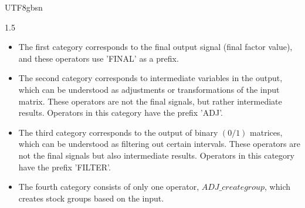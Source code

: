 \documentclass{article}
\begin{document}
\begin{CJK}{UTF8}{gbsn}
\begin{spacing}{1.5}
\begin{itemize}
\item[*] The first category corresponds to the final output signal (final factor value), and these operators use 'FINAL' as a prefix.
\item[*] The second category corresponds to intermediate variables in the output, which can be understood as adjustments or transformations of the input matrix. These operators are not the final signals, but rather intermediate results. Operators in this category have the prefix 'ADJ'.
\item[*] The third category corresponds to the output of binary $(0/1)$ matrices, which can be understood as filtering out certain intervals. These operators are not the final signals but also intermediate results. Operators in this category have the prefix 'FILTER'.
\item[*] The fourth category consists of only one operator, $ADJ\_creategroup$, which creates stock groups based on the input.
\end{itemize}



\end{spacing}
\end{CJK}
\end{document}
